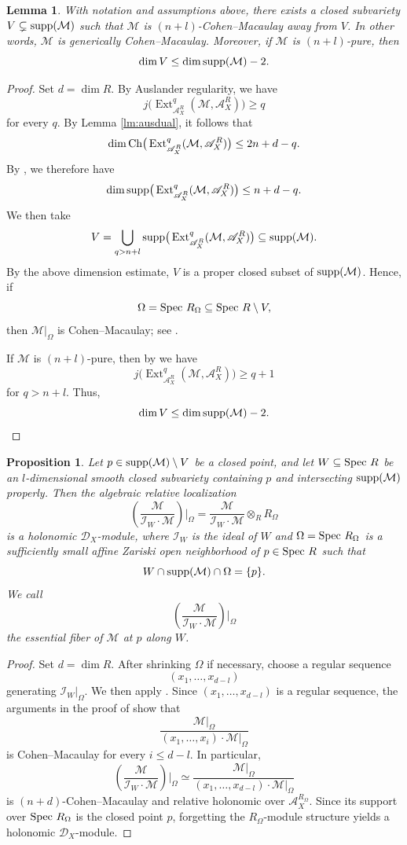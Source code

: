 \documentclass{amsart}
\theoremstyle{plain}
\numberwithin{theorem}{section}
\newtheorem{prop}[theorem]{Proposition}
\newtheorem{lemma}[theorem]{Lemma}
\theoremstyle{definition}
\theoremstyle{remark}
\theoremstyle{definition}
\newcommand{\cI}{\mathcal{I}}
\newcommand{\cM}{\mathcal{M}}
\newcommand{\sA}{\mathscr{A}}
\newcommand{\shD}{\mathscr{D}}
\newcommand{\Spec}{\textup{Spec }}
\newcommand{\supp}{\textup{supp}}
\newcommand{\Ch}{\textup{Ch}}
\begin{document}
\begin{lemma}\label{lm:genericCMness}
With notation and assumptions above, there exists a closed subvariety
$V\subsetneq \supp(\cM)$
such that $\cM$ is $(n+l)$-Cohen--Macaulay away from $V$. In other words,
$\cM$ is generically Cohen--Macaulay. Moreover, if $\cM$ is $(n+l)$-pure, then
\[
\dim V\le \dim \supp(\cM)-2.
\]
\end{lemma}

\begin{proof}
Set $d=\dim R$. By Auslander regularity, we have
\[
j\big(\operatorname{Ext}^q_{\sA_X^R}(\cM,\sA_X^R)\big)\ge q
\]
for every $q$. By Lemma \ref{lm:ausdual}, it follows that
\[
\dim \Ch\big(\operatorname{Ext}^q_{\sA_X^R}(\cM,\sA_X^R)\big)
\le 2n+d-q.
\]
By \cite[Lem.3.4.1]{BVWZ}, we therefore have
\[
\dim \supp\big(\operatorname{Ext}^q_{\sA_X^R}(\cM,\sA_X^R)\big)
\le n+d-q.
\]
We then take
\[
V=
\bigcup_{q>n+l}
\supp\big(\operatorname{Ext}^q_{\sA_X^R}(\cM,\sA_X^R)\big)
\subseteq \supp(\cM).
\]
By the above dimension estimate, $V$ is a proper closed subset of
$\supp(\cM)$. Hence, if
\[
\Omega=\Spec R_\Omega\subseteq \Spec R\setminus V,
\]
then $\cM|_\Omega$ is Cohen--Macaulay; see \cite[Def.3.3.1]{BVWZ}.

If $\cM$ is $(n+l)$-pure, then by \cite[A.IV 2.6]{BJ} we have
\[
j\big(\operatorname{Ext}^q_{\sA_X^R}(\cM,\sA_X^R)\big)\ge q+1
\]
for $q>n+l$. Thus,
\[
\dim V\le \dim \supp(\cM)-2.
\]
\end{proof}

\begin{prop}\label{prop:essfib}
Let $p\in \supp(\cM)\setminus V$ be a closed point, and let
$W\subseteq \Spec R$
be an $l$-dimensional smooth closed subvariety containing $p$ and intersecting
$\supp(\cM)$ properly. Then the algebraic relative localization
\[
\left(\frac{\cM}{\cI_W\cdot\cM}\right)\bigg|_{\Omega}
=
\frac{\cM}{\cI_W\cdot\cM}\otimes_R R_\Omega
\]
is a holonomic $\shD_X$-module, where $\cI_W$ is the ideal of $W$ and
$\Omega=\Spec R_\Omega$ is a sufficiently small affine Zariski open
neighborhood of $p\in \Spec R$ such that
\[
W\cap \supp(\cM)\cap \Omega=\{p\}.
\]
We call
\[
\left(\frac{\cM}{\cI_W\cdot\cM}\right)\bigg|_{\Omega}
\]
the \emph{essential fiber} of $\cM$ at $p$ along $W$.
\end{prop}

\begin{proof}
Set $d=\dim R$. After shrinking $\Omega$ if necessary, choose a regular
sequence
\[
(x_1,\dots,x_{d-l})
\]
generating $\cI_W|_\Omega$. We then apply
\cite[Lem.3.4.2]{BVWZ}. Since $(x_1,\dots,x_{d-l})$ is a regular sequence,
the arguments in the proof of \cite[Prop.3.4.3]{BVWZ} show that
\[
\frac{\cM|_\Omega}{(x_1,\dots,x_i)\cdot \cM|_\Omega}
\]
is Cohen--Macaulay for every $i\le d-l$. In particular,
\[
\left(\frac{\cM}{\cI_W\cdot\cM}\right)\bigg|_{\Omega}
\simeq
\frac{\cM|_\Omega}{(x_1,\dots,x_{d-l})\cdot \cM|_\Omega}
\]
is $(n+d)$-Cohen--Macaulay and relative holonomic over
$\sA_X^{R_\Omega}$. Since its support over $\Spec R_\Omega$ is the closed
point $p$, forgetting the $R_\Omega$-module structure yields a holonomic
$\shD_X$-module.
\end{proof}
\end{document}
